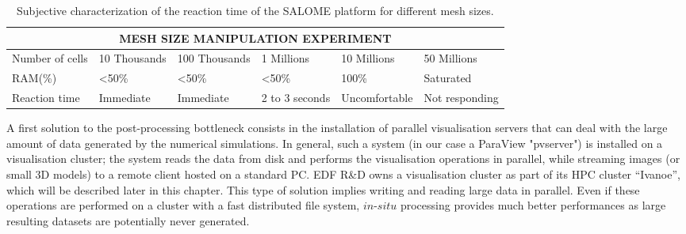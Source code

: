 \begin{table}
\centering
\begin{tabular}{|p{1.5cm}|p{2.0cm}|p{2.20cm}|p{1.50cm}|p{2cm}|p{2cm}|}
\hline
\multicolumn{6}{|c|}{\textbf{MESH SIZE MANIPULATION EXPERIMENT}}\\
\hline
Number of cells & 10 Thousands & 100 Thousands & 1 Millions & 10 Millions & 50 Millions \\
\hline
RAM(\%) & <50\% & <50\% & <50\% & 100\% & Saturated \\
\hline
Reaction time & Immediate & Immediate & 2 to 3 seconds & Uncomfortable & Not responding \\
\hline
\end{tabular}
\caption{Subjective characterization of the reaction time of the SALOME platform for different mesh sizes.}
\label{fig:tabmot}
\vspace{-0.15in}
\end{table}

A first solution to the post-processing bottleneck consists in the installation 
of parallel visualisation servers that can deal with the large amount of data generated 
by the numerical simulations. In general, such
a system (in our case a ParaView "pvserver") is installed on a visualisation
cluster; the system reads the data from disk and performs the visualisation operations in
parallel, while streaming images (or small 3D models) to a remote client hosted on a standard PC. 
EDF R\&D owns a visualisation cluster as part of its HPC cluster ``Ivanoe'', which will
be described later in this chapter. This type of solution implies writing and 
reading large data in parallel. Even if
these operations are performed on a cluster with a fast distributed file system,
$in$-$situ$ processing provides much better performances as large resulting datasets 
are potentially never generated. 

